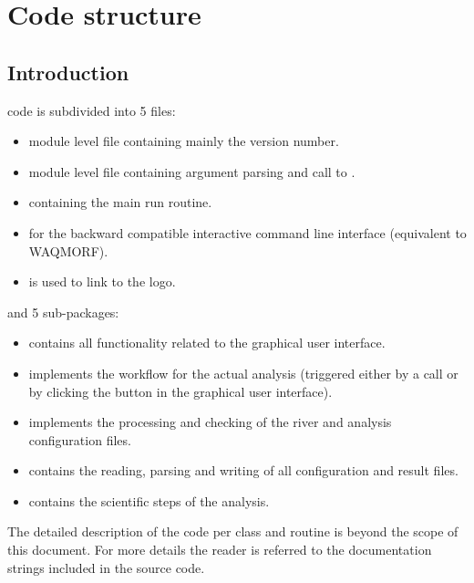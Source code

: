 \chapter{Code structure}

\section{Introduction}

\dfastmi code is subdivided into 5 files:

\begin{itemize}
\item {} module level file containing mainly the version number.
\item {} module level file containing argument parsing and call to .
\item {} containing the main run routine.
\item {} for the backward compatible interactive command line interface (equivalent to WAQMORF).
\item {} is used to link to the \dfastmi logo.
\end{itemize}

and 5 sub-packages:

\begin{itemize}
\item {} contains all functionality related to the graphical user interface.
\item {} implements the workflow for the actual \dfastmi analysis (triggered either by a  call or by clicking the  button in the graphical user interface).
\item {} implements the processing and checking of the river and analysis configuration files.
\item {} contains the reading, parsing and writing of all configuration and result files.
\item {} contains the scientific steps of the analysis.
\end{itemize}

The detailed description of the code per class and routine is beyond the scope of this document.
For more details the reader is referred to the documentation strings included in the source code.
